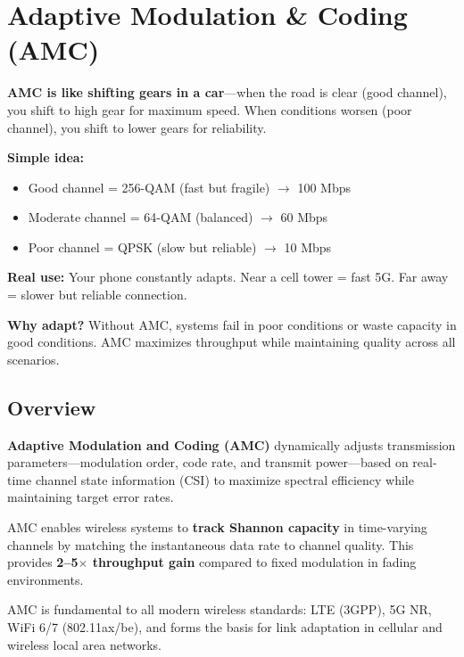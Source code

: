 \chapter{Adaptive Modulation \& Coding (AMC)}
\label{ch:amc}

\begin{nontechnical}
\textbf{AMC is like shifting gears in a car}---when the road is clear (good channel), you shift to high gear for maximum speed. When conditions worsen (poor channel), you shift to lower gears for reliability.

\textbf{Simple idea:}
\begin{itemize}
\item Good channel = 256-QAM (fast but fragile) $\rightarrow$ 100 Mbps
\item Moderate channel = 64-QAM (balanced) $\rightarrow$ 60 Mbps
\item Poor channel = QPSK (slow but reliable) $\rightarrow$ 10 Mbps
\end{itemize}

\textbf{Real use:} Your phone constantly adapts. Near a cell tower = fast 5G. Far away = slower but reliable connection.

\textbf{Why adapt?} Without AMC, systems fail in poor conditions or waste capacity in good conditions. AMC maximizes throughput while maintaining quality across all scenarios.
\end{nontechnical}

\section{Overview}

\textbf{Adaptive Modulation and Coding (AMC)} dynamically adjusts transmission parameters---modulation order, code rate, and transmit power---based on real-time channel state information (CSI) to maximize spectral efficiency while maintaining target error rates.

\begin{keyconcept}
AMC enables wireless systems to \textbf{track Shannon capacity} in time-varying channels by matching the instantaneous data rate to channel quality. This provides \textbf{2--5$\times$ throughput gain} compared to fixed modulation in fading environments.
\end{keyconcept}

AMC is fundamental to all modern wireless standards: LTE (3GPP), 5G NR, WiFi 6/7 (802.11ax/be), and forms the basis for link adaptation in cellular and wireless local area networks.

